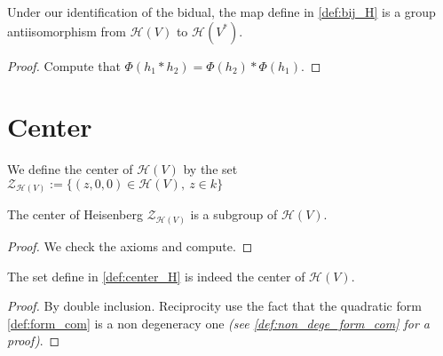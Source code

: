 \begin{definition}
    \label{prop:antiisoH}
    \leanok 

    Under our identification of the bidual, the map define in \ref{def:bij_H} is
    a group antiisomorphism from $\mathcal{H}(V)$ to $\mathcal{H}(V^*)$.
    \begin{proof}
        \leanok
        Compute that $\Phi(h_1*h_2)=\Phi(h_2)*\Phi(h_1)$.
    \end{proof}
\end{definition}

\section{Center}

\begin{definition}
    \label{def:center_H}
    \leanok 

    We define the center of $\mathcal{H}(V)$ by the set
    $\mathcal{Z}_{\mathcal{H}(V)}:=\{(z,0,0)\in\mathcal{H}(V),\ z\in k\}$
\end{definition}

\begin{proposition}
    \label{prop:center_H_subgroup}
    \leanok

    The center of Heisenberg $\mathcal{Z}_{\mathcal{H}(V)}$ is a subgroup
    of $\mathcal{H}(V)$.
    \begin{proof}
        \leanok
        We check the axioms and compute.
    \end{proof}
\end{proposition}

\begin{proposition}
    \label{prop:center_H_is_center}
    \leanok

    The set define in \ref{def:center_H} is indeed the center of $\mathcal{H}(V)$.
    \begin{proof}
        \leanok
        By double inclusion. Reciprocity use the fact that the quadratic form \ref{def:form_com}
        is a non degeneracy one \textit{(see \ref{def:non_dege_form_com} for a proof)}.
    \end{proof}
\end{proposition}

